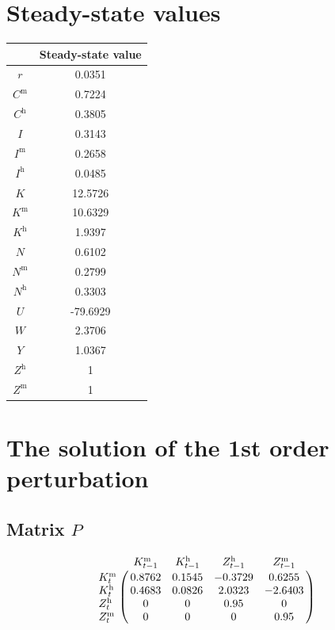 

\section{Steady-state values}


\begin{tabular}{c|c|}
  & Steady-state value\\
\hline
$r$ & 0.0351 \\
$C^{\mathrm{m}}$ & 0.7224 \\
$C^{\mathrm{h}}$ & 0.3805 \\
$I$ & 0.3143 \\
$I^{\mathrm{m}}$ & 0.2658 \\
$I^{\mathrm{h}}$ & 0.0485 \\
$K$ & 12.5726 \\
$K^{\mathrm{m}}$ & 10.6329 \\
$K^{\mathrm{h}}$ & 1.9397 \\
$N$ & 0.6102 \\
$N^{\mathrm{m}}$ & 0.2799 \\
$N^{\mathrm{h}}$ & 0.3303 \\
$U$ & -79.6929 \\
$W$ & 2.3706 \\
$Y$ & 1.0367 \\
$Z^{\mathrm{h}}$ & 1 \\
$Z^{\mathrm{m}}$ & 1 \\
\hline
\end{tabular}


\section{The solution of the 1st order perturbation}

\subsection*{Matrix $P$}

$$\bordermatrix{
~ & K^{\mathrm{m}}_{t-1} & K^{\mathrm{h}}_{t-1} & Z^{\mathrm{h}}_{t-1} & Z^{\mathrm{m}}_{t-1} \cr
K^{\mathrm{m}}_{t} & 0.8762 & 0.1545 & -0.3729 & 0.6255 \cr
K^{\mathrm{h}}_{t} & 0.4683 & 0.0826 & 2.0323 & -2.6403 \cr
Z^{\mathrm{h}}_{t} & 0 & 0 & 0.95 & 0 \cr
Z^{\mathrm{m}}_{t} & 0 & 0 & 0 & 0.95 \cr
}$$

